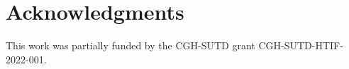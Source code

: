 \section{Acknowledgments}

This work was partially funded by the CGH-SUTD grant CGH-SUTD-HTIF-2022-001.